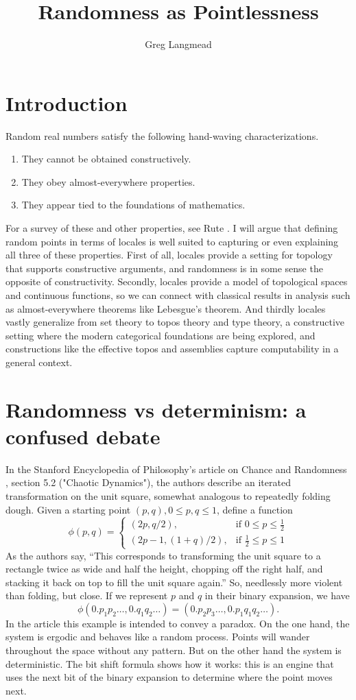 \documentclass[12pt]{extarticle}
\title{Randomness as Pointlessness}
\author{Greg Langmead}
\begin{document}
\maketitle
\section{Introduction}
Random real numbers satisfy the following hand-waving characterizations.
\begin{enumerate}
\item They cannot be obtained constructively.
\item They obey almost-everywhere properties.
\item They appear tied to the foundations of mathematics.
\end{enumerate}
For a survey of these and other properties, see Rute \cite{rute}. I will argue that defining random points in terms of locales is well suited to capturing or even explaining all three of these properties. First of all, locales provide a setting for topology that supports constructive arguments, and randomness is in some sense the opposite of constructivity. Secondly, locales provide a model of topological spaces and continuous functions, so we can connect with classical results in analysis such as almost-everywhere theorems like Lebesgue's theorem. And thirdly locales vastly generalize from set theory to topos theory and type theory, a constructive setting where the modern categorical foundations are being explored, and constructions like the effective topos and assemblies capture computability in a general context.
\section{Randomness vs determinism: a confused debate}
In the Stanford Encyclopedia of Philosophy's article on Chance and Randomness \cite{sep-chance-randomness}, section 5.2 ("Chaotic Dynamics"), the authors describe an iterated transformation on the unit square, somewhat analogous to repeatedly folding dough. Given a starting point $(p,q), 0\leq p, q\leq 1$, define a function
\[
\phi(p,q) =
 \begin{cases}
 (2p, q/2), & \text{if } 0 \le p \le \frac{1}{2} \\
 (2p-1,(1+q)/2), & \text{if } \frac{1}{2} \le p \le 1
 \end{cases}
 \]
As the authors say, ``This corresponds to transforming the unit square to a rectangle twice as wide and half the height, chopping off the right half, and stacking it back on top to fill the unit square again.'' So, needlessly more violent than folding, but close. If we represent $p$ and $q$ in their binary expansion, we have \[ \phi (0.p_1 p_2\ldots, 0.q_1 q_2\ldots) = (0.p_2 p_3\ldots , 0.p_1 q_1 q_2\ldots).\]
In the article this example is intended to convey a paradox. On the one hand, the system is ergodic and behaves like a random process. Points will wander throughout the space without any pattern. But on the other hand the system is deterministic. The bit shift formula shows how it works: this is an engine that uses the next bit of the binary expansion to determine where the point moves next.
\end{document}
